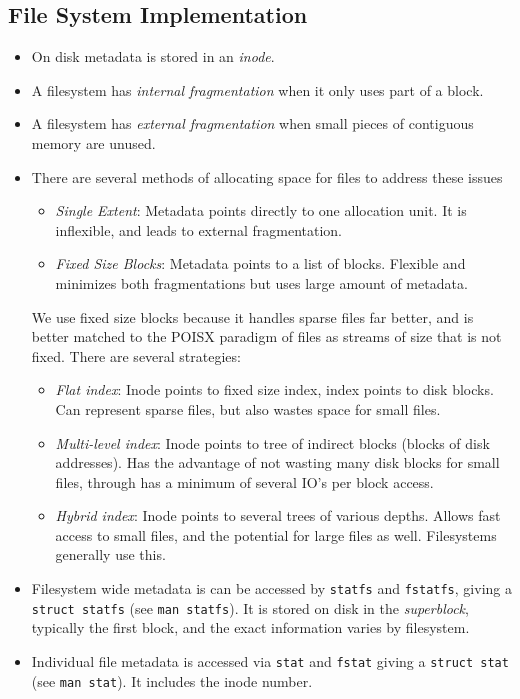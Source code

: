 \documentclass[12pt]{article}
\begin{document}
\subsection{File System Implementation}
\begin{itemize}
	\item On disk metadata is stored in an \textit{inode}.
	\item A filesystem has \textit{internal fragmentation} when it only uses part of a block.
	\item A filesystem has \textit{external fragmentation} when small pieces of contiguous memory are unused. 
	\item There are several methods of allocating space for files to address these issues
		\begin{itemize}
			\item \textit{Single Extent}: Metadata points directly to one allocation unit. It is inflexible, and leads to external fragmentation. 
			\item \textit{Fixed Size Blocks}: Metadata points to a list of blocks. Flexible and minimizes both fragmentations but uses large amount of metadata. 
		\end{itemize}
		We use fixed size blocks because it handles sparse files far better, and is better matched to the POISX paradigm of files as streams of size that is not fixed. There are several strategies:
		\begin{itemize}
			\item \textit{Flat index}: Inode points to fixed size index, index points to disk blocks. Can represent sparse files, but also wastes space for small files. 
				\newpage
			\item \textit{Multi-level index}: Inode points to tree of indirect blocks (blocks of disk addresses). Has the advantage of not wasting many disk blocks for small files, through has a minimum of several IO's per block access. 
			\item \textit{Hybrid index}: Inode points to several trees of various depths. Allows fast access to small files, and the potential for large files as well. Filesystems generally use this. 
		\end{itemize}
	\item Filesystem wide metadata is can be accessed by \texttt{statfs} and \texttt{fstatfs}, giving a \texttt{struct statfs} (see \texttt{man statfs}). It is stored on disk in the \textit{superblock}, typically the first block, and the exact information varies by filesystem. 
	\item Individual file metadata is accessed via \texttt{stat} and \texttt{fstat} giving a \texttt{struct stat} (see \texttt{man stat}). It includes the inode number. 

\end{itemize}
\end{document}
